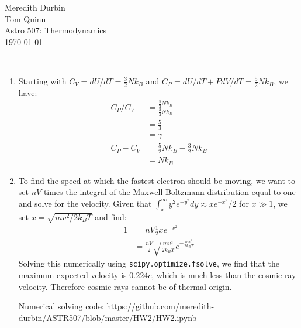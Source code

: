 \documentclass[11pt]{article}
\begin{document}
\begin{flushright}Meredith Durbin\\
Tom Quinn\\
Astro 507: Thermodynamics\\
\today\\

\end{flushright}

 \\[6pt]

\begin{enumerate}

\item
	Starting with $C_V = dU/dT = \frac{3}{2}Nk_B$ and $C_P = dU/dT + PdV/dT = \frac{5}{2}Nk_B$, we have: 
    \begin{align}
    C_P/C_V &= \frac{\frac{5}{2}Nk_B}{\frac{3}{2}Nk_B} \\
    &= \frac{5}{3} \\
    &= \gamma \\
    C_P - C_V &= \frac{5}{2}Nk_B - \frac{3}{2}Nk_B \\
    &= Nk_B
    \end{align}
\item
    To find the speed at which the fastest electron should be moving, we want to set $nV$ times the integral of the Maxwell-Boltzmann distribution equal to one and solve for the velocity. Given that $\int_x^\infty y^2 e^{-y^2} dy \approx xe^{-x^2}/2$ for $x \gg 1$, we set $x = \sqrt{mv^2/2k_B T}$ and find:
    \begin{align}
	1 &= nV \frac{1}{2}x e^{-x^2} \\
	&= \frac{nV}{2}\sqrt{\frac{mv^2}{2k_B T}} e^{-\frac{mv^2}{2k_B T}}
    \end{align}
    Solving this numerically using \texttt{scipy.optimize.fsolve}, we find that the maximum expected velocity is $0.224c$, which is much less than the cosmic ray velocity. Therefore cosmic rays cannot be of thermal origin.
    
    Numerical solving code: \url{https://github.com/meredith-durbin/ASTR507/blob/master/HW2/HW2.ipynb}


\end{enumerate}
\end{document}
